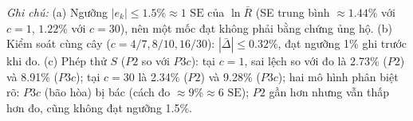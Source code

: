 \medskip\par\raggedright\footnotesize
\textit{Ghi chú:} (a) Ngưỡng $|e_k| \le 1.5\% \approx 1\text{ SE}$ của $\ln\bar R$ (SE trung bình $\approx 1.44\%$ với $c=1$, $1.22\%$ với $c=30$), nên một mốc đạt không phải bằng chứng ủng hộ. (b) Kiểm soát cùng cây ($c = 4/7, 8/10, 16/30$): $|\bar\Delta| \le 0.32\%$, đạt ngưỡng 1\% ghi trước khi đo. (c) Phép thử $S$ ($P2$ so với $P3c$): tại $c=1$, sai lệch so với đo là 2.73\% ($P2$) và 8.91\% ($P3c$); tại $c=30$ là 2.34\% ($P2$) và 9.28\% ($P3c$); hai mô hình phân biệt rõ: $P3c$ (bão hòa) bị bác (cách đo $\approx 9\% \approx 6\text{ SE}$); $P2$ gần hơn nhưng vẫn thấp hơn đo, cũng không đạt ngưỡng 1.5\%.
